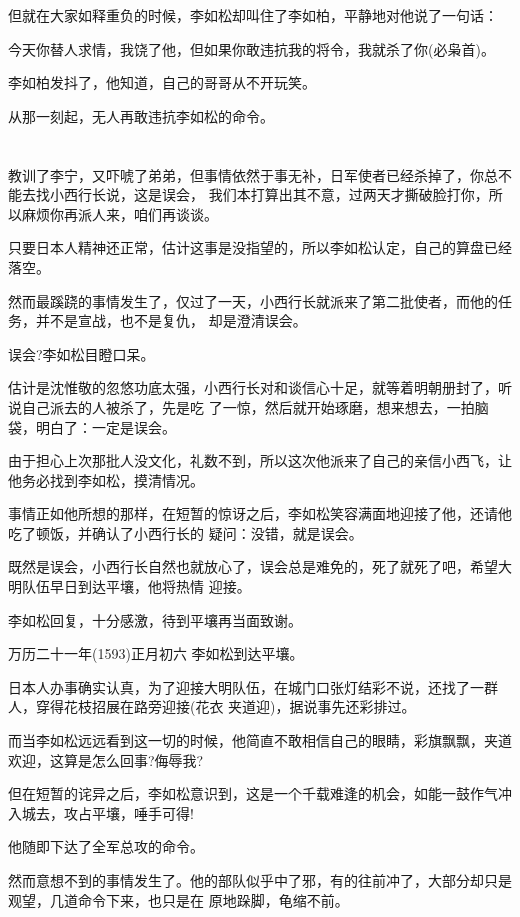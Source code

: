 \documentclass[11pt,a4paper,onecolumn]{article}
\begin{document}
但就在大家如释重负的时候，李如松却叫住了李如柏，平静地对他说了一句话：

今天你替人求情，我饶了他，但如果你敢违抗我的将令，我就杀了你(必枭首)。

李如柏发抖了，他知道，自己的哥哥从不开玩笑。

从那一刻起，无人再敢违抗李如松的命令。

\section[\thesection]{}

教训了李宁，又吓唬了弟弟，但事情依然于事无补，日军使者已经杀掉了，你总不能去找小西行长说，这是误会，
我们本打算出其不意，过两天才撕破脸打你，所以麻烦你再派人来，咱们再谈谈。

只要日本人精神还正常，估计这事是没指望的，所以李如松认定，自己的算盘已经落空。

然而最蹊跷的事情发生了，仅过了一天，小西行长就派来了第二批使者，而他的任务，并不是宣战，也不是复仇，
却是澄清误会。

误会?李如松目瞪口呆。

估计是沈惟敬的忽悠功底太强，小西行长对和谈信心十足，就等着明朝册封了，听说自己派去的人被杀了，先是吃
了一惊，然后就开始琢磨，想来想去，一拍脑袋，明白了：一定是误会。

由于担心上次那批人没文化，礼数不到，所以这次他派来了自己的亲信小西飞，让他务必找到李如松，摸清情况。

事情正如他所想的那样，在短暂的惊讶之后，李如松笑容满面地迎接了他，还请他吃了顿饭，并确认了小西行长的
疑问：没错，就是误会。

既然是误会，小西行长自然也就放心了，误会总是难免的，死了就死了吧，希望大明队伍早日到达平壤，他将热情
迎接。

李如松回复，十分感激，待到平壤再当面致谢。

万历二十一年(1593)正月初六 李如松到达平壤。

日本人办事确实认真，为了迎接大明队伍，在城门口张灯结彩不说，还找了一群人，穿得花枝招展在路旁迎接(花衣
夹道迎)，据说事先还彩排过。

而当李如松远远看到这一切的时候，他简直不敢相信自己的眼睛，彩旗飘飘，夹道欢迎，这算是怎么回事?侮辱我?

但在短暂的诧异之后，李如松意识到，这是一个千载难逢的机会，如能一鼓作气冲入城去，攻占平壤，唾手可得!

他随即下达了全军总攻的命令。

然而意想不到的事情发生了。他的部队似乎中了邪，有的往前冲了，大部分却只是观望，几道命令下来，也只是在
原地跺脚，龟缩不前。
\end{document}
